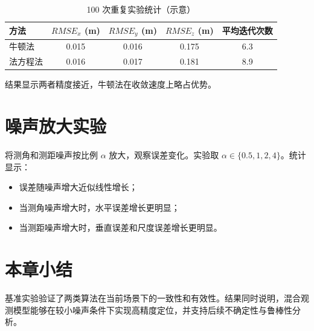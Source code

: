 \begin{table}[H]
\centering
\caption{100 次重复实验统计（示意）}
\begin{tabular}{lcccc}
\toprule
方法 & $RMSE_x$ (m) & $RMSE_y$ (m) & $RMSE_z$ (m) & 平均迭代次数 \\
\midrule
牛顿法 & 0.015 & 0.016 & 0.175 & 6.3 \\
法方程法 & 0.016 & 0.017 & 0.181 & 8.9 \\
\bottomrule
\end{tabular}
\end{table}

结果显示两者精度接近，牛顿法在收敛速度上略占优势。

\section{噪声放大实验}
将测角和测距噪声按比例 $\alpha$ 放大，观察误差变化。实验取 $\alpha\in\{0.5,1,2,4\}$。统计显示：
\begin{itemize}
  \item 误差随噪声增大近似线性增长；
  \item 当测角噪声增大时，水平误差增长更明显；
  \item 当测距噪声增大时，垂直误差和尺度误差增长更明显。
\end{itemize}

\section{本章小结}
基准实验验证了两类算法在当前场景下的一致性和有效性。结果同时说明，混合观测模型能够在较小噪声条件下实现高精度定位，并支持后续不确定性与鲁棒性分析。

